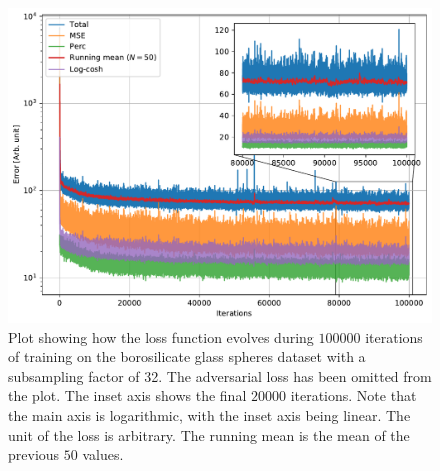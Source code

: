 \begin{figure}[htbp]
  \centering
  \includegraphics[width=.8\textwidth]{figures/losstomo00058ns32itd4mse035logcosh3depth1.pdf}
  \caption[Loss function evolution during training]{Plot showing how the loss function evolves during $100000$ iterations of training on the borosilicate glass spheres dataset with a subsampling factor of 32. The adversarial loss has been omitted from the plot. The inset axis shows the final $20000$ iterations. Note that the main axis is logarithmic, with the inset axis being linear. The unit of the loss is arbitrary. The running mean is the mean of the previous $50$ values. }
  \label{fig:losstomo00058noadv}
\end{figure}

